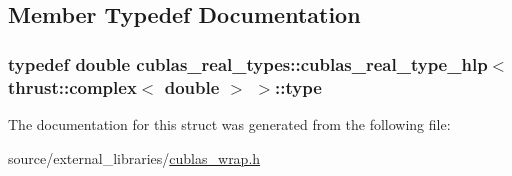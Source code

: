 \subsection{Member Typedef Documentation}
\hypertarget{structcublas__real__types_1_1cublas__real__type__hlp_3_01thrust_1_1complex_3_01double_01_4_01_4_a3c16a6086c808ba1aab003acb23ad9fb}{
\subsubsection[{type}]{\setlength{\rightskip}{0pt plus 5cm}typedef double {\bf cublas\-\_\-real\-\_\-types\-::cublas\-\_\-real\-\_\-type\-\_\-hlp}$<$ {\bf thrust\-::complex}$<$ double $>$ $>$\-::{\bf type}}}\label{structcublas__real__types_1_1cublas__real__type__hlp_3_01thrust_1_1complex_3_01double_01_4_01_4_a3c16a6086c808ba1aab003acb23ad9fb}


The documentation for this struct was generated from the following file\-:\begin{DoxyCompactItemize}
\item 
source/external\-\_\-libraries/\hyperlink{cublas__wrap_8h}{cublas\-\_\-wrap.\-h}\end{DoxyCompactItemize}
